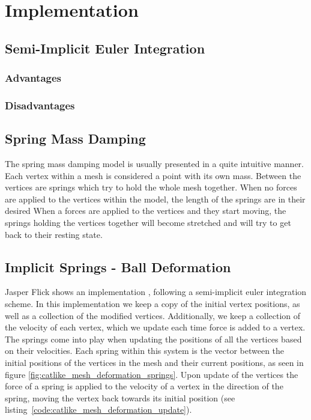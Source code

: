 \chapter{Implementation}
\label{chap:implementation}

\section{Semi-Implicit Euler Integration}
\subsection{Advantages}
\subsection{Disadvantages}

\section{Spring Mass Damping}
The spring mass damping model is usually presented in a quite intuitive manner.
Each vertex within a mesh is considered a point with its own mass.
Between the vertices are springs which try to hold the whole mesh together.
When no forces are applied to the vertices within the model, the length of the springs are in their desired 
When a forces are applied to the vertices and they start moving, the springs holding the vertices together will become stretched
and will try to get back to their resting state.


\section{Implicit Springs - Ball Deformation}
Jasper Flick\cite{catlike_mesh_deformation} shows an implementation , following a semi-implicit euler integration scheme.
In this implementation we keep a copy of the initial vertex positions, as well as a collection of the modified vertices.
Additionally, we keep a collection of the velocity of each vertex, which we update each time force is added to a vertex.
The springs come into play when updating the positions of all the vertices based on their velocities.
Each spring within this system is the vector between the initial positions of the vertices in the mesh and their current positions, as seen in figure \ref{fig:catlike_mesh_deformation_springs}.
Upon update of the vertices the force of a spring is applied to the velocity of a vertex in the direction of the spring, moving the vertex back towards its initial position (see listing~\ref{code:catlike_mesh_deformation_update}).

